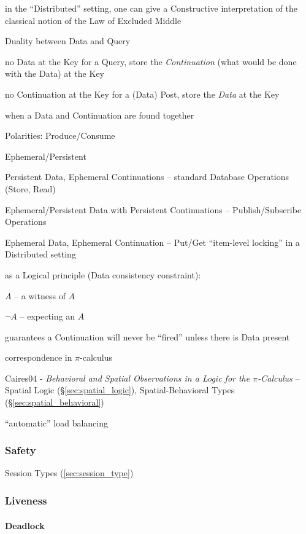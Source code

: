 in the ``Distributed'' setting, one can give a Constructive interpretation of
the classical notion of the Law of Excluded Middle

Duality between Data and Query

no Data at the Key for a Query, store the \emph{Continuation} (what would be
done with the Data) at the Key

no Continuation at the Key for a (Data) Post, store the \emph{Data} at the Key

when a Data and Continuation are found together

Polarities: Produce/Consume

Ephemeral/Persistent

Persistent Data, Ephemeral Continuations -- standard Database Operations (Store,
Read)

Ephemeral/Persistent Data with Persistent Continuations -- Publish/Subscribe
Operations

Ephemeral Data, Ephemeral Continuation -- Put/Get ``item-level locking'' in a
Distributed setting

as a Logical principle (Data consistency constraint):

$A$ -- a witness of $A$

$\neg A$ -- expecting an $A$

guarantees a Continuation will never be ``fired'' unless there is Data present

correspondence in $\pi$-calculus

Caires04 - \emph{Behavioral and Spatial Observations in a Logic for the
  $\pi$-Calculus} -- Spatial Logic (\S\ref{sec:spatial_logic}),
Spatial-Behavioral Types (\S\ref{sec:spatial_behavioral})

``automatic'' load balancing



\subsubsection{Safety}\label{sec:safety}

\fist Session Types (\ref{sec:session_type})



\subsubsection{Liveness}\label{sec:liveness}

\paragraph{Deadlock}\label{sec:deadlock}\hfill

